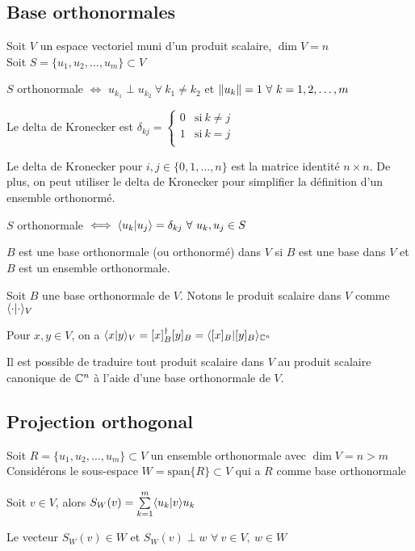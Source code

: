 \subsection{Base orthonormales}
Soit $V$ un espace vectoriel muni d'un produit scalaire, $\dim V = n$ \\
Soit $S = \{u_1, u_2, \dots, u_m\} \subset V$
\begin{definition}
      $S$ orthonormale $\iff$
      $u_{k_1} \perp u_{k_2} \ \forall \ k_1 \neq k_2$ et $\left\lVert u_k\right\rVert = 1 \ \forall \ k = 1, 2, \dots, m$ 
\end{definition}
\begin{definition}
      Le delta de Kronecker est $\delta_{kj} = \begin{cases}
            0 & \text{si} \ k \neq j \\
            1 & \text{si} \ k = j \\
      \end{cases}$
\end{definition}
\begin{remark}
      Le delta de Kronecker pour $i, j \in \{0, 1, \dots, n\}$ est la matrice identité $n \times n$.
      De plus, on peut utiliser le delta de Kronecker pour simplifier la définition d'un ensemble orthonormé.
\end{remark}
\begin{definition}
      $S$ orthonormale $\iff \langle u_k \lvert u_j \rangle = \delta_{kj} \ \forall \ u_k, u_j \in S$ 
\end{definition}
\begin{definition}
      $B$ est une base orthonormale (ou orthonormé) dans $V$ si $B$ est une base dans $V$ et 
      $B$ est un ensemble orthonormale.
\end{definition}
Soit $B$ une base orthonormale de $V$. Notons le produit scalaire dans $V$ comme $\langle \cdot \lvert \cdot \rangle_V$
\begin{theorem}
      Pour $x, y \in V$, on a $\langle x \lvert y \rangle_V = [x]_B^\dagger [y]_B = \langle [x]_B \lvert [y]_B \rangle_{\mathbb{C}^n}$
\end{theorem}
\begin{remark}
      Il est possible de traduire tout produit scalaire dans $V$ au produit scalaire canonique de
      $\mathbb{C}^n$ à l'aide d'une base orthonormale de $V$.
\end{remark}

\subsection{Projection orthogonal}
Soit $R = \{u_1, u_2, \dots, u_m\} \subset V$ un ensemble orthonormale avec $\dim V = n > m$ \\
Considérons le sous-espace $W = \text{span}\{R\} \subset V$ qui a $R$ comme base orthonormale
\begin{definition}
      Soit $v \in V$, alors $S_W(v) = \sum\limits_{k = 1}^{m}\langle u_k \lvert v \rangle{u_k}$
\end{definition}
\begin{theorem}
      Le vecteur $S_W(v) \in W$ et $S_W(v) \perp w$ $\forall \ v \in V, \ w \in W$
\end{theorem}

